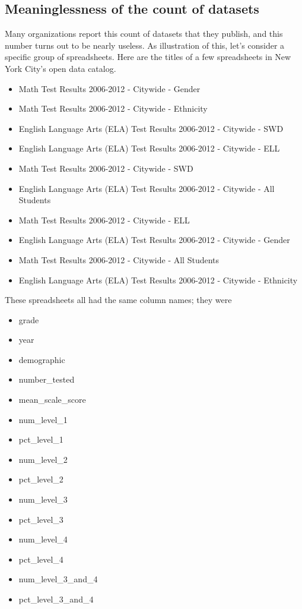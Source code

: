 \documentclass{acm_proc_article-sp}
\begin{document}
\subsection{Meaninglessness of the count of datasets} \label{colnames}
Many organizations report this count of datasets that they publish, and this number
turns out to be nearly useless. As illustration of this, let's consider a specific
group of spreadsheets. Here are the titles of a few spreadsheets in New York City's
open data catalog.

\begin{itemize}
\item Math Test Results 2006-2012 - Citywide - Gender
\item Math Test Results 2006-2012 - Citywide - Ethnicity
\item English Language Arts (ELA) Test Results 2006-2012 - Citywide - SWD
\item English Language Arts (ELA) Test Results 2006-2012 - Citywide - ELL
\item Math Test Results 2006-2012 - Citywide - SWD
\item English Language Arts (ELA) Test Results 2006-2012 - Citywide - All Students
\item Math Test Results 2006-2012 - Citywide - ELL
\item English Language Arts (ELA) Test Results 2006-2012 - Citywide - Gender
\item Math Test Results 2006-2012 - Citywide - All Students
\item English Language Arts (ELA) Test Results 2006-2012 - Citywide - Ethnicity
\end{itemize}

These spreadsheets all had the same column names; they were

\begin{itemize}
\item grade
\item year
\item demographic
\item number\_tested
\item mean\_scale\_score
\item num\_level\_1
\item pct\_level\_1
\item num\_level\_2
\item pct\_level\_2
\item num\_level\_3
\item pct\_level\_3
\item num\_level\_4
\item pct\_level\_4
\item num\_level\_3\_and\_4
\item pct\_level\_3\_and\_4
\end{itemize}
\end{document}
